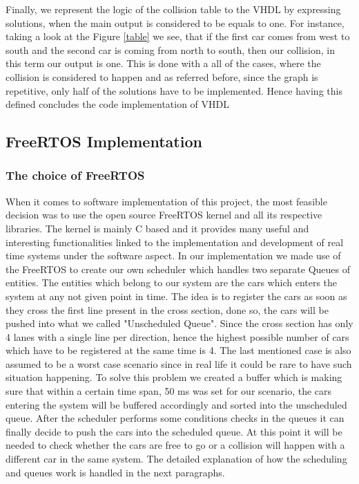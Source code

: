 \documentclass[conference]{IEEEtran}
\begin{document}
Finally, we represent the logic of the collision table to the VHDL by expressing solutions, when the main output is considered to be equals to one. For instance, taking a look at the Figure \ref{table} we see, that if the first car comes from west to south and the second car is coming from north to south, then our collision, in this term our output is one. This is done with a all of the cases, where the collision is considered to happen and as referred before, since the graph is repetitive, only half of the solutions have to be implemented. Hence having this defined concludes the code implementation of VHDL

\subsection{FreeRTOS Implementation}

\subsubsection{The choice of FreeRTOS}

When it comes to software implementation of this project, the most feasible decision was to use the open source FreeRTOS kernel and all its respective libraries. The kernel is mainly C based and it provides many useful and interesting functionalities linked to the implementation and development of real time systems under the software aspect. In our implementation we made use of the FreeRTOS to create our own scheduler which handles two separate Queues of entities. The entities which belong to our system are the cars which enters the system at any not given point in time. The idea is to register the cars as soon as they cross the first line present in the cross section, done so, the cars will be pushed into what we called "Unscheduled Queue". Since the cross section has only 4 lanes with a single line per direction, hence the highest possible number of cars which have to be registered at the same time is 4. The last mentioned case is also assumed to be a worst case scenario since in real life it could be rare to have such situation happening. To solve this problem we created a buffer which is making sure that within a certain time span, 50 ms was set for our scenario, the cars entering the system will be buffered accordingly and sorted into the unscheduled queue. After the scheduler performs some conditions checks in the queues it can finally decide to push the cars into the scheduled queue. At this point it will be needed to check whether the cars are free to go or a collision will happen with a different car in the same system. The detailed explanation of how the scheduling and queues work is handled in the next paragraphs.
\end{document}
